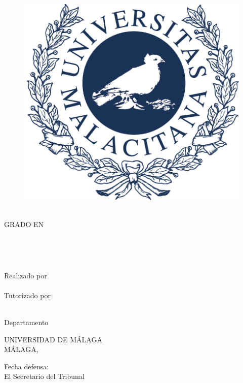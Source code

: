 \begin{center}
    \begin{figure}[h]
        \centering
        \includegraphics[scale=0.2]{images/marcauma.png}
    \end{figure}

    \MakeUppercase{\facultad} \\
    GRADO EN \MakeUppercase{\grado} \\
    \vspace{3cm}
    
    {\large	\tituloes} \\
    \ifdef{\subtituloes}{
        \textit{\subtituloes} \\
    }{}
    \bigbreak
    
    {\large	\tituloen} \\
    \ifdef{\subtituloen}{
        \textit{\subtituloen} \\
    }{}
    \bigbreak
    
    Realizado por \\
    \textbf{\alumno} \\
    
    Tutorizado por \\
    \textbf{\tutor} \\
    
    Departamento \\
    \textbf{\departamento}
    \bigbreak
    
    UNIVERSIDAD DE MÁLAGA \\
    MÁLAGA, \MakeUppercase{\fecha}
\end{center}

\vfill

Fecha defensa: \\
El Secretario del Tribunal
